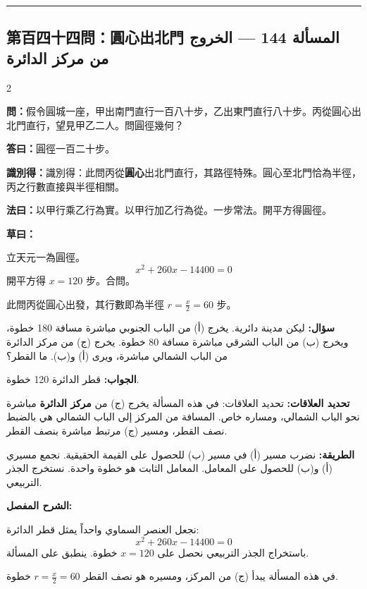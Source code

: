 \documentclass[11pt,a4paper]{article}
\newcommand{\ar}[1]{\arabicfont\beginR #1\endR}
\newcommand{\arb}[1]{\textbf{\arabicfont\beginR #1\endR}}
\newcommand{\longline}{\noindent\rule{\textwidth}{0.4pt}}
\newcommand{\arnote}[1]{\textcolor{arabicblue}{\ar{#1}}}
\newcommand{\wen}[1]{\par\noindent\textbf{\textcolor{probcolor}{問：}}{#1}\par}
\newcommand{\da}[1]{\par\noindent\textbf{\textcolor{anscolor}{答曰：}}{#1}\par}
\newcommand{\fayue}[1]{\par\noindent\textbf{\textcolor{methodcolor}{法曰：}}{#1}\par}
\newcommand{\caoyue}[1]{\par\noindent\textbf{草曰：}{#1}\par}
\newcommand{\zhi}[1]{\par\noindent\textbf{識別得：}{#1}\par}
\newcommand{\arwen}[1]{\par\noindent\arb{سؤال: }\arnote{#1}\par}
\newcommand{\arjwb}[1]{\par\noindent\arb{الجواب: }\arnote{#1}\par}
\newcommand{\arqwd}[1]{\par\noindent\arb{الطريقة: }\arnote{#1}\par}
\newcommand{\arshr}[1]{\par\noindent\arb{الشرح المفصل: }\arnote{#1}\par}
\newcommand{\arfl}[1]{\par\noindent\arb{تحديد العلاقات: }\arnote{#1}\par}
\begin{document}
\vspace{0.3cm}
\longline

\subsection*{第百四十四問：圓心出北門 \hfill \ar{المسألة 144 — الخروج من مركز الدائرة}}

\begin{paracol}{2}

\begin{leftcolumn}
\wen{假令圓城一座，甲出南門直行一百八十步，乙出東門直行八十步。丙從圓心出北門直行，望見甲乙二人。問圓徑幾何？}

\da{圓徑一百二十步。}

\zhi{識別得：此問丙從\textbf{圓心}出北門直行，其路徑特殊。圓心至北門恰為半徑，丙之行數直接與半徑相關。}

\fayue{以甲行乘乙行為實。以甲行加乙行為從。一步常法。開平方得圓徑。}

\caoyue{
立天元一為圓徑。
$$x^2 + 260x - 14400 = 0$$
開平方得 $x = 120$ 步。合問。

此問丙從圓心出發，其行數即為半徑 $r = \frac{x}{2} = 60$ 步。}
\end{leftcolumn}

\begin{rightcolumn}
\arwen{ليكن مدينة دائرية. يخرج (أ) من الباب الجنوبي مباشرة مسافة 180 خطوة، ويخرج (ب) من الباب الشرقي مباشرة مسافة 80 خطوة. يخرج (ج) من مركز الدائرة من الباب الشمالي مباشرة، ويرى (أ) و(ب). ما القطر؟}

\arjwb{قطر الدائرة 120 خطوة.}

\arfl{تحديد العلاقات: في هذه المسألة يخرج (ج) من \textbf{مركز الدائرة} مباشرة نحو الباب الشمالي، ومساره خاص. المسافة من المركز إلى الباب الشمالي هي بالضبط نصف القطر، ومسير (ج) مرتبط مباشرة بنصف القطر.}

\arqwd{نضرب مسير (أ) في مسير (ب) للحصول على القيمة الحقيقية. نجمع مسيري (أ) و(ب) للحصول على المعامل. المعامل الثابت هو خطوة واحدة. نستخرج الجذر التربيعي.}

\arshr{نجعل العنصر السماوي واحداً يمثل قطر الدائرة:
$$x^2 + 260x - 14400 = 0$$
باستخراج الجذر التربيعي نحصل على $x = 120$ خطوة. ينطبق على المسألة.

في هذه المسألة يبدأ (ج) من المركز، ومسيره هو نصف القطر $r = \frac{x}{2} = 60$ خطوة.}
\end{rightcolumn}

\end{paracol}
\end{document}
